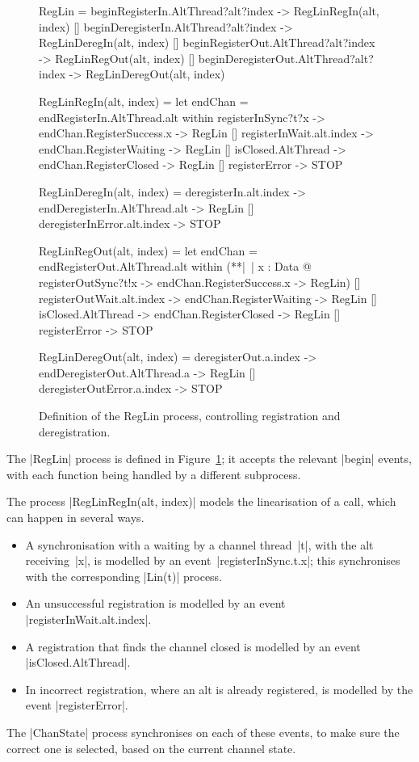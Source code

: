 
\begin{figure}
\begin{cspm}
RegLin = 
  beginRegisterIn.AltThread?alt?index -> RegLinRegIn(alt, index)
  [] beginDeregisterIn.AltThread?alt?index -> RegLinDeregIn(alt, index)
  [] beginRegisterOut.AltThread?alt?index -> RegLinRegOut(alt, index)
  [] beginDeregisterOut.AltThread?alt?index -> RegLinDeregOut(alt, index)
  
RegLinRegIn(alt, index) = 
  let endChan = endRegisterIn.AltThread.alt within
  registerInSync?t?x -> endChan.RegisterSuccess.x -> RegLin
  [] registerInWait.alt.index -> endChan.RegisterWaiting -> RegLin
  [] isClosed.AltThread -> endChan.RegisterClosed -> RegLin
  [] registerError -> STOP
  
RegLinDeregIn(alt, index) = 
  deregisterIn.alt.index -> endDeregisterIn.AltThread.alt -> RegLin
  [] deregisterInError.alt.index -> STOP
  
RegLinRegOut(alt, index) = 
  let endChan = endRegisterOut.AltThread.alt within
  (**|~| x : Data @ registerOutSync?t!x -> endChan.RegisterSuccess.x -> RegLin)
  [] registerOutWait.alt.index -> endChan.RegisterWaiting -> RegLin
  [] isClosed.AltThread -> endChan.RegisterClosed -> RegLin
  [] registerError -> STOP
  
RegLinDeregOut(alt, index) = 
  deregisterOut.a.index -> endDeregisterOut.AltThread.a -> RegLin
  [] deregisterOutError.a.index -> STOP
\end{cspm}
\caption{Definition of the {\cspmstyle RegLin} process, controlling
  registration and deregistration.  \label{fig:RegLin}}
\end{figure}


The |RegLin| process is defined in Figure~\ref{fig:RegLin}; it accepts the
relevant |begin| events, with each function being handled by a different
subprocess. 

The process |RegLinRegIn(alt, index)| models the linearisation of a
 call, which can happen in several ways.
%
\begin{itemize}
\item A synchronisation with a waiting  by a channel thread~|t|,
  with the alt receiving~|x|, is modelled by an event~|registerInSync.t.x|;
  this synchronises with the corresponding |Lin(t)| process.

\item An unsuccessful registration is modelled by an
  event |registerInWait.alt.index|.

\item A registration that finds the channel closed is modelled by an event
  |isClosed.AltThread|.

\item In incorrect registration, where an alt is already registered, is
  modelled by the event |registerError|.
\end{itemize}
% 
The |ChanState| process synchronises on each of these events, to make sure the
correct one is selected, based on the current channel state. 

